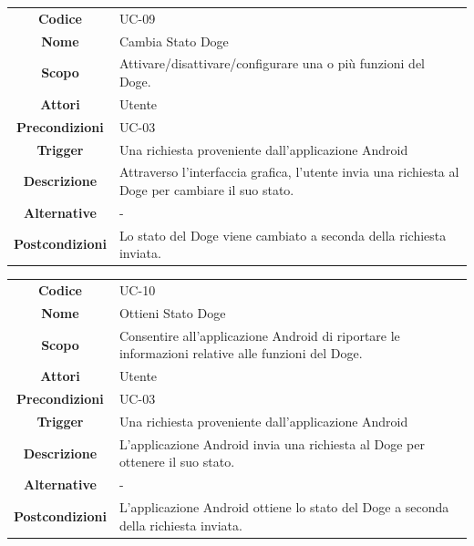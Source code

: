 \documentclass{article}
\begin{document}
    \begin{adjustbox}{center}
    \begin{tabular}{|c|p{10cm}|}
    \hline
    \textbf{Codice} & UC-09 \\
    \textbf{Nome} & Cambia Stato Doge \\
    \textbf{Scopo} & Attivare/disattivare/configurare una o più funzioni del Doge. \\
    \textbf{Attori} & Utente \\
    \textbf{Precondizioni} & UC-03 \\
    \textbf{Trigger} & Una richiesta proveniente dall'applicazione Android \\
    \textbf{Descrizione} & Attraverso l'interfaccia grafica, l'utente invia una richiesta al Doge per cambiare il suo stato. \\
    \textbf{Alternative} & - \\
    \textbf{Postcondizioni} & Lo stato del Doge viene cambiato a seconda della richiesta inviata. \\
    \hline
    \end{tabular}
    \end{adjustbox}
    
    \begin{adjustbox}{center}
    \begin{tabular}{|c|p{10cm}|}
    \hline
    \textbf{Codice} & UC-10 \\
    \textbf{Nome} & Ottieni Stato Doge \\
    \textbf{Scopo} & Consentire all'applicazione Android di riportare le informazioni relative alle funzioni del Doge. \\
    \textbf{Attori} & Utente \\
    \textbf{Precondizioni} & UC-03 \\
    \textbf{Trigger} & Una richiesta proveniente dall'applicazione Android \\
    \textbf{Descrizione} & L'applicazione Android invia una richiesta al Doge per ottenere il suo stato. \\
    \textbf{Alternative} & - \\
    \textbf{Postcondizioni} & L'applicazione Android ottiene lo stato del Doge a seconda della richiesta inviata. \\
    \hline
    \end{tabular}
    \end{adjustbox}
    
\end{document}
